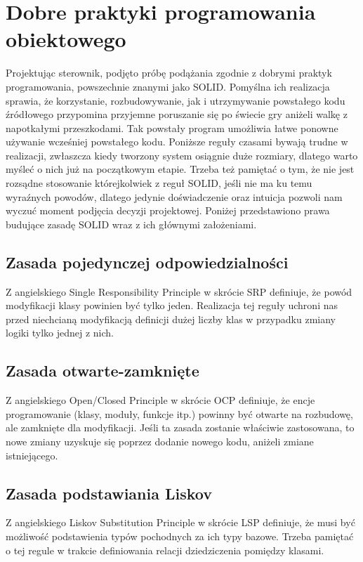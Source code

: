 \chapter{Dobre praktyki programowania obiektowego}
Projektując sterownik, podjęto próbę podążania zgodnie z dobrymi praktyk programowania, powszechnie znanymi jako SOLID.
Pomyślna ich realizacja sprawia, że korzystanie, rozbudowywanie, jak i utrzymywanie powstałego kodu źródłowego przypomina
przyjemne poruszanie się po świecie gry aniżeli walkę z napotkałymi przeszkodami. 
Tak powstały program umożliwia łatwe ponowne używanie wcześniej powstałego kodu.
Poniższe reguły czasami bywają trudne w realizacji, zwłaszcza kiedy tworzony system osiągnie duże rozmiary, dlatego warto myśleć o nich już na początkowym etapie. 
Trzeba też pamiętać o tym, że nie jest rozsądne stosowanie którejkolwiek z reguł SOLID, jeśli nie ma ku temu wyraźnych powodów, dlatego 
jedynie doświadczenie oraz intuicja pozwoli nam wyczuć moment podjęcia decyzji projektowej.
Poniżej przedstawiono prawa budujące zasadę SOLID wraz z ich głównymi założeniami.

\section{Zasada pojedynczej odpowiedzialności}
Z angielskiego Single Responsibility Principle w skrócie SRP definiuje, że powód modyfikacji klasy powinien być tylko jeden.
\cite[103]{martin2015zwinne}
Realizacja tej reguły uchroni nas przed niechcianą modyfikacją definicji dużej liczby klas w przypadku zmiany logiki tylko jednej z nich.

\section{Zasada otwarte-zamknięte}
Z angielskiego Open/Closed Principle w skrócie OCP definiuje, że encje programowanie (klasy, moduły, funkcje itp.) powinny być otwarte na rozbudowę, 
ale zamknięte dla modyfikacji.
\cite[117]{martin2015zwinne}
Jeśli ta zasada zostanie właściwie zastosowana, to nowe zmiany uzyskuje się poprzez dodanie nowego kodu, aniżeli zmiane istniejącego. 

\section{Zasada podstawiania Liskov}
Z angielskiego Liskov Substitution Principle w skrócie LSP definiuje, że musi być możliwość podstawienia typów pochodnych za ich typy bazowe.
\cite[127]{martin2015zwinne}
Trzeba pamiętać o tej regule w trakcie definiowania relacji dziedziczenia pomiędzy klasami.

